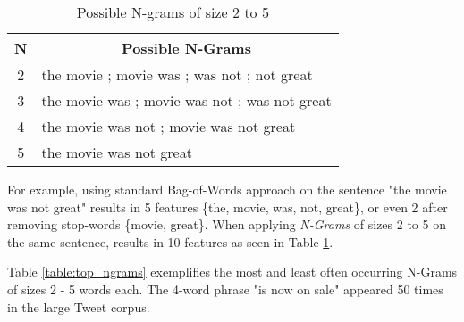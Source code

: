 		\begin{table}[h]	
			\begin{center}
				\begin{tabular}{c l} 
					\hline\hline
					N &  \multicolumn{1}{c}{Possible N-Grams }  \\ 
					\hline
					2 & the movie ; movie was ; was not ; not great  \\
					3 & the movie was ; movie was not ; was not great \\
					4 & the movie was not ; movie was not great \\
					5 & the movie was not great \\ 
					\hline\hline
				\end{tabular}
			\end{center}
			\caption[N-Gram Example]{Possible N-grams of size 2 to 5 }
			\label{table:ngrams}
		\end{table}
	
		For example, using standard Bag-of-Words approach on the sentence "the movie was not great" results in 5 features \{the, movie, was, not, great\}, or even 2 after removing stop-words \{movie, great\}. When applying \textit{N-Grams} of sizes 2 to 5 on the same sentence, results in 10 features as seen in Table \ref{table:ngrams}.
		
		\par 
		
		Table \ref{table:top_ngrams} exemplifies the most and least often occurring N-Grams of sizes 2 - 5 words each. The 4-word phrase "is now on sale" appeared 50 times in the large Tweet corpus.
		
